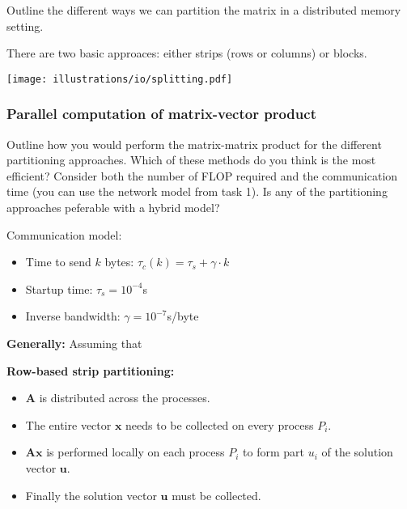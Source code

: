 \begin{question}
  Outline the different ways we can partition the matrix in a distributed memory setting.
\end{question}

\noindent There are two basic approaces: either strips (rows or columns) or blocks.

\begin{center}
  \texttt{[image: illustrations/io/splitting.pdf]}
\end{center}


\subsubsection{Parallel computation of matrix-vector product} %
\label{ssub:parallel_computation_of_matrix_vector_product}


\begin{question}
  Outline how you would perform the matrix-matrix product for the different partitioning approaches. Which of these methods do you think is the most efficient? Consider both the number of FLOP required and the communication time (you can use the network model from task 1). Is any of the partitioning approaches peferable with a hybrid model?

  \noindent Communication model:
  \begin{itemize} \itemsep=0em
    \item Time to send $k$ bytes: $\tau_c(k) = \tau_s + \gamma \cdot k$
    \item Startup time: $\tau_s = 10^{-4}$s
    \item Inverse bandwidth: $\gamma = 10^{-7}$s/byte
  \end{itemize}

\end{question}

\noindent \textbf{Generally:} Assuming that

\noindent\textbf{Row-based strip partitioning:}

\begin{itemize}
  \item $\mathbf{A}$ is distributed across the processes.
  \item The entire vector $\mathbf{x}$ needs to be collected on every process $P_i$.
  \item $\mathbf{Ax}$ is performed locally on each process $P_i$ to form part $u_i$ of the solution vector $\mathbf{u}$.
  \item Finally the solution vector $\mathbf{u}$ must be collected.
\end{itemize}

